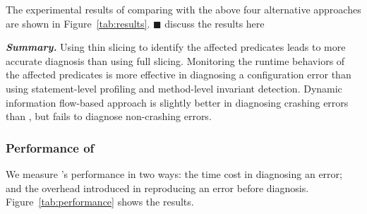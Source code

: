 
\vspace{1mm}

The experimental results of comparing \ourtool with the above
four alternative approaches are shown in Figure~\ref{tab:results}.
$\blacksquare$ discuss the results here

\vspace{1mm}
\noindent \textbf{\textit{Summary.}} Using thin slicing to identify
the affected predicates leads to more accurate diagnosis than using
full slicing. Monitoring the runtime behaviors of the affected
predicates is more effective in diagnosing a configuration error
than using statement-level profiling and method-level invariant detection.
Dynamic information flow-based approach is slightly better in diagnosing
crashing errors than \ourtool, but fails to diagnose non-crashing errors.


\subsubsection{Performance of \ourtool}
\label{sec:performance}

We measure \ourtool's performance in two ways: the time cost
in diagnosing an error; and the overhead introduced
in reproducing an error before diagnosis.  Figure~\ref{tab:performance}
shows the results.

